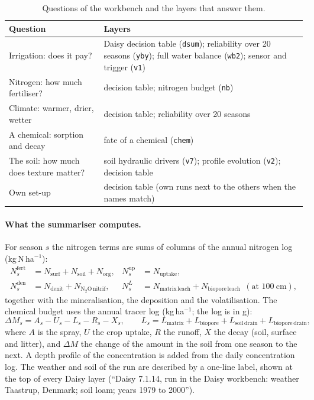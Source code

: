\begin{table}[H]\centering\small
\caption{Questions of the workbench and the layers that answer them.}\label{tab:match}
\begin{tabularx}{\textwidth}{>{\raggedright\arraybackslash}p{3.2cm}X}
\toprule Question & Layers\\\midrule
Irrigation: does it pay? & Daisy decision table (\texttt{dsum}); reliability over 20 seasons (\texttt{yby}); full water balance (\texttt{wb2}); sensor and trigger (\texttt{v1})\\
Nitrogen: how much fertiliser? & decision table; nitrogen budget (\texttt{nb})\\
Climate: warmer, drier, wetter & decision table; reliability over 20 seasons\\
A chemical: sorption and decay & fate of a chemical (\texttt{chem})\\
The soil: how much does texture matter? & soil hydraulic drivers (\texttt{v7}); profile evolution (\texttt{v2}); decision table\\
Own set-up & decision table (own runs next to the others when the names match)\\\bottomrule
\end{tabularx}
\end{table}

\paragraph{What the summariser computes.}
For season $s$ the nitrogen terms are sums of columns of the annual nitrogen log (kg\,N\,ha$^{-1}$):
\begin{equation}\label{eq:nsum}
\begin{aligned}
N^{\mathrm{fert}}_s&=N_{\mathrm{surf}}+N_{\mathrm{soil}}+N_{\mathrm{org}}, & N^{\mathrm{up}}_s&=N_{\mathrm{uptake}},\\
N^{\mathrm{den}}_s&=N_{\mathrm{denit}}+N_{\mathrm{N_2O\,nitrif}}, & N^{L}_s&=N_{\mathrm{matrix\,leach}}+N_{\mathrm{biopore\,leach}}\ \ (\text{at }100\ \mathrm{cm}),
\end{aligned}
\end{equation}
together with the mineralisation, the deposition and the volatilisation. The chemical budget uses the annual tracer log (kg\,ha$^{-1}$; the log is in g):
\begin{equation}\label{eq:chem}
\Delta M_s = A_s - U_s - L_s - R_s - X_s,\qquad L_s=L_{\mathrm{matrix}}+L_{\mathrm{biopore}}+L_{\mathrm{soil\,drain}}+L_{\mathrm{biopore\,drain}},
\end{equation}
where $A$ is the spray, $U$ the crop uptake, $R$ the runoff, $X$ the decay (soil, surface and litter), and $\Delta M$ the change of the amount in the soil from one season to the next. A depth profile of the concentration is added from the daily concentration log. The weather and soil of the run are described by a one-line label, shown at the top of every Daisy layer (``Daisy 7.1.14, run in the Daisy workbench: weather Taastrup, Denmark; soil loam; years 1979 to 2000'').

